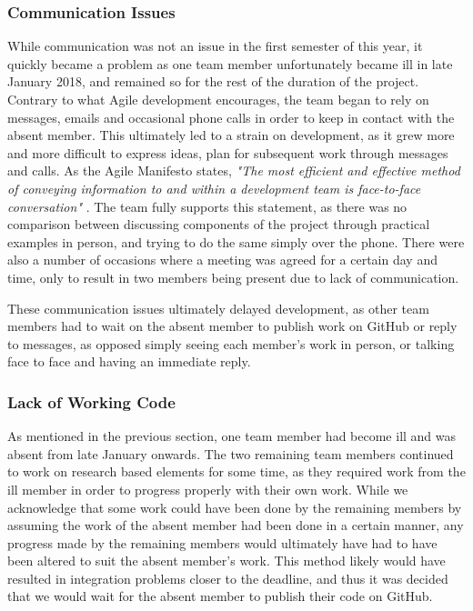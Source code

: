 \subsubsection{Communication Issues}
While communication was not an issue in the first semester of this year, it quickly became a problem as one team member unfortunately became ill in late January 2018, and remained so for the rest of the duration of the project. Contrary to what Agile development encourages, the team began to rely on messages, emails and occasional phone calls in order to keep in contact with the absent member. This ultimately led to a strain on development, as it grew more and more difficult to express ideas, plan for subsequent work through messages and calls. As the Agile Manifesto states, \textit{"The most efficient and effective method of conveying information to and within a development team is face-to-face conversation"} \cite{agilemani}. The team fully supports this statement, as there was no comparison between discussing components of the project through practical examples in person, and trying to do the same simply over the phone. There were also a number of occasions where a meeting was agreed for a certain day and time, only to result in two members being present due to lack of communication.

These communication issues ultimately delayed development, as other team members had to wait on the absent member to publish work on GitHub or reply to messages, as opposed simply seeing each member's work in person, or talking face to face and having an immediate reply. 

\subsubsection{Lack of Working Code}
As mentioned in the previous section, one team member had become ill and was absent from late January onwards. The two remaining team members continued to work on research based elements for some time, as they required work from the ill member in order to progress properly with their own work. While we acknowledge that some work could have been done by the remaining members by assuming the work of the absent member had been done in a certain manner, any progress made by the remaining members would ultimately have had to have been altered to suit the absent member's work. This method likely would have resulted in integration problems closer to the deadline, and thus it was decided that we would wait for the absent member to publish their code on GitHub.

